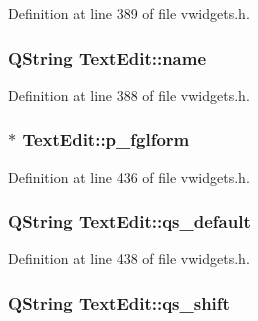 Definition at line 389 of file vwidgets.h.

\hypertarget{classTextEdit_a3701b552998825c3eef0a125f3dfdd43}{
\subsubsection[{name}]{\setlength{\rightskip}{0pt plus 5cm}QString {\bf TextEdit::name}}}
\label{classTextEdit_a3701b552998825c3eef0a125f3dfdd43}


Definition at line 388 of file vwidgets.h.

\hypertarget{classTextEdit_a87f2fefca5d7ef36f73e6501138404d1}{
\subsubsection[{p\_\-fglform}]{$\ast$ {\bf TextEdit::p\_\-fglform}}}
\label{classTextEdit_a87f2fefca5d7ef36f73e6501138404d1}


Definition at line 436 of file vwidgets.h.

\hypertarget{classTextEdit_afd10cc57579bfbb4731769d0850708a5}{
\subsubsection[{qs\_\-default}]{\setlength{\rightskip}{0pt plus 5cm}QString {\bf TextEdit::qs\_\-default}}}
\label{classTextEdit_afd10cc57579bfbb4731769d0850708a5}


Definition at line 438 of file vwidgets.h.

\hypertarget{classTextEdit_a32cae2cba431754bcd4c871ec80dcf57}{
\subsubsection[{qs\_\-shift}]{\setlength{\rightskip}{0pt plus 5cm}QString {\bf TextEdit::qs\_\-shift}}}
\label{classTextEdit_a32cae2cba431754bcd4c871ec80dcf57}


